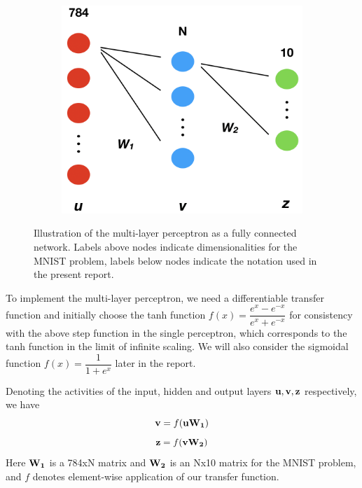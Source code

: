 \documentclass{article}
\begin{document}
\begin{figure}[h]
	\centering
	\begin{subfigure}[t]{0.32\linewidth}
		\centering
		\includegraphics[width = 1.0\linewidth, trim={0 0 0 0}, clip=true]{figures/network_structure.png}
	\end{subfigure}%
\caption{Illustration of the multi-layer perceptron as a fully connected network. Labels above nodes indicate dimensionalities for the MNIST problem, labels below nodes indicate the notation used in the present report.}
\label{fig:network}
\end{figure}

To implement the multi-layer perceptron, we need a differentiable transfer function and initially choose the tanh function $f(x) = \dfrac{e^x-e^{-x}}{e^x+e^{-x}}$ for consistency with the above step function in the single perceptron, which corresponds to the tanh function in the limit of infinite scaling. We will also consider the sigmoidal function $f(x) = \dfrac{1}{1+e^x}$ later in the report.

Denoting the activities of the input, hidden and output layers ${\bf u}, {\bf v}, {\bf z}$ respectively, we have
\begin{equation}
{\bf v} = f( {\bf u W_1} )
\end{equation}
\begin{equation}\label{eq:layer2}
{\bf z} = f( {\bf v W_2} )
\end{equation}
Here $\bf{W}_1$ is a 784xN matrix and $\bf{W}_2$ is an Nx10 matrix for the MNIST problem, and $f$ denotes element-wise application of our transfer function.
\end{document}
